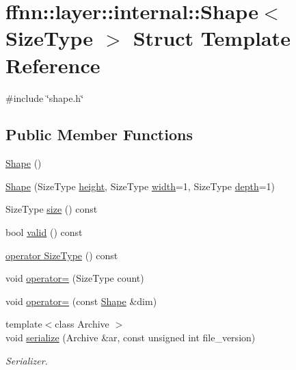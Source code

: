 \hypertarget{structffnn_1_1layer_1_1internal_1_1_shape}{\section{ffnn\-:\-:layer\-:\-:internal\-:\-:Shape$<$ Size\-Type $>$ Struct Template Reference}
\label{structffnn_1_1layer_1_1internal_1_1_shape}
}


{\ttfamily \#include \char`\"{}shape.\-h\char`\"{}}

\subsection*{Public Member Functions}
\begin{DoxyCompactItemize}
\item 
\hyperlink{structffnn_1_1layer_1_1internal_1_1_shape_a3312341e1632adc5a9ce0ac39f69d673}{Shape} ()
\item 
\hyperlink{structffnn_1_1layer_1_1internal_1_1_shape_a1d737a19140ac84315c3acd950504519}{Shape} (Size\-Type \hyperlink{structffnn_1_1layer_1_1internal_1_1_shape_ac48f7c8b470265b0f886393e32dab4e7}{height}, Size\-Type \hyperlink{structffnn_1_1layer_1_1internal_1_1_shape_ae8155a14b907ad1af92d108d5d77e12c}{width}=1, Size\-Type \hyperlink{structffnn_1_1layer_1_1internal_1_1_shape_a16a6855288e10d47c4793b03b46c4d52}{depth}=1)
\item 
Size\-Type \hyperlink{structffnn_1_1layer_1_1internal_1_1_shape_a12c68148f45338261ebff941384e4c6a}{size} () const 
\item 
bool \hyperlink{structffnn_1_1layer_1_1internal_1_1_shape_acc533095c9443af724b842ff31da4233}{valid} () const 
\item 
\hyperlink{structffnn_1_1layer_1_1internal_1_1_shape_a917a31dbf9a743c129a7f9e5127d932b}{operator Size\-Type} () const 
\item 
void \hyperlink{structffnn_1_1layer_1_1internal_1_1_shape_a7cf81fd95b594d58f16a5b73c9550a73}{operator=} (Size\-Type count)
\item 
void \hyperlink{structffnn_1_1layer_1_1internal_1_1_shape_a0b3ca541952c279b6aaeec2ff3145b52}{operator=} (const \hyperlink{structffnn_1_1layer_1_1internal_1_1_shape}{Shape} \&dim)
\item 
{\footnotesize template$<$class Archive $>$ }\\void \hyperlink{structffnn_1_1layer_1_1internal_1_1_shape_a3e7e9afc473d463474840d05004679e0}{serialize} (Archive \&ar, const unsigned int file\-\_\-version)
\begin{DoxyCompactList}\small\item\em Serializer. \end{DoxyCompactList}\end{DoxyCompactItemize}
